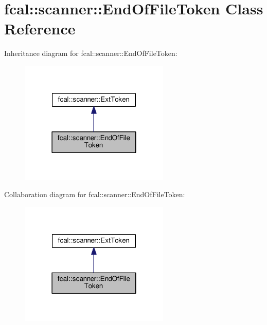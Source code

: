 \hypertarget{classfcal_1_1scanner_1_1EndOfFileToken}{}\section{fcal\+:\+:scanner\+:\+:End\+Of\+File\+Token Class Reference}
\label{classfcal_1_1scanner_1_1EndOfFileToken}


Inheritance diagram for fcal\+:\+:scanner\+:\+:End\+Of\+File\+Token\+:\nopagebreak
\begin{figure}[H]
\begin{center}
\leavevmode
\includegraphics[width=202pt]{classfcal_1_1scanner_1_1EndOfFileToken__inherit__graph}
\end{center}
\end{figure}


Collaboration diagram for fcal\+:\+:scanner\+:\+:End\+Of\+File\+Token\+:\nopagebreak
\begin{figure}[H]
\begin{center}
\leavevmode
\includegraphics[width=202pt]{classfcal_1_1scanner_1_1EndOfFileToken__coll__graph}
\end{center}
\end{figure}
